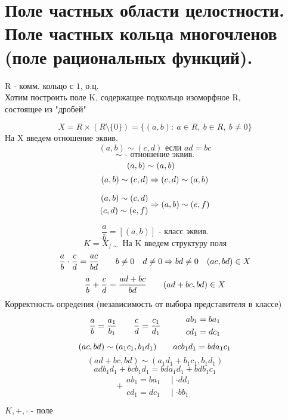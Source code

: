 \documentclass[12pt, fleqn]{article}
\begin{document}
\section{Поле частных области целостности. Поле частных кольца многочленов \\(поле рациональных функций).}

    \begin{definition}
        R - комм. кольцо с $1$, о.ц.\\
        Хотим построить поле K, содержащее подкольцо изоморфное R, \\ состоящее из "дробей"

        \[X = R \times (R \setminus \{0\}) = \{(a, b) : \ a \in R, \  b \in R, \  b \neq 0\}\]
        На X введем отношение эквив.
        \[(a, b) \sim (c, d) \text{ если } ad = bc\]
        \[\sim \text{ - отношение эквив.}\]
        \[(a, b) \sim (a, b) \quad\]
        \[(a, b) \sim (c, d) \Rightarrow (c, d) \sim (a, b)\]

        \[\begin{align}
            (a,b) \sim (c, d)\\
            (c, d) \sim (e, f)
        \end{align}
        \Rightarrow (a, b) \sim (e, f)
        \]

        \[\frac{a}{b} = [(a, b)] \text{ - класс эквив.} \]
        \[K = X_{/\sim} \text{ На K введем структуру поля}\]
        \[\frac{a}{b} \cdot \frac{c}{d} = \frac{ac}{bd} \quad \quad b \neq 0 \quad d \neq 0 \Rightarrow bd \neq 0 \quad (ac, bd) \in X\]
        \[\frac{a}{b} + \frac{c}{d} = \frac{ad + bc}{bd} \quad\quad (ad + bc, bd) \in X\]
        Корректность опредения (независимость от выбора представителя в классе)
        \[\frac{a}{b} = \frac{a_1}{b_1} \quad\quad \frac{c}{d} = \frac{c_1}{d_1} \quad\quad\quad
        \begin{align}
            ab_1 = ba_1\\
            cd_1 = dc_1
        \end{align}\]
        \[(ac, bd) \sim (a_1 c_1, b_1 d_1) \quad\quad a c b_1 d_1 = bd a_1 c_1\]
        \[(ad + bc, bd) \sim (a_1 d_1 + b_1 c_1, b_1 d_1)\]
        \[ad b_1 d_1 + bc b_1 d_1 = bd a_1 d_1 + bd b_1 c_1\]
        \[+ \begin{align}
            ab_1 = ba_1 & \ \mid \cdot dd_1\\
            cd_1 = dc_1 & \ \mid \cdot bb_1
        \end{align}\]

        \begin{theorem}
            $K, +, \cdot \text{ - поле} $
        \end{theorem}


\end{definition}
\end{document}
